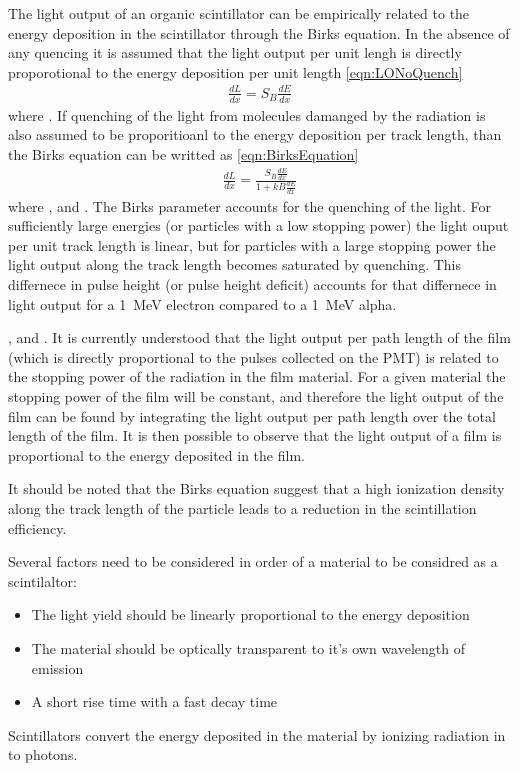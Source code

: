 The light output of an organic scintillator can be empirically related to the energy deposition in the scintillator through the Birks equation.
In the absence of any quencing it is assumed that the light output per unit lengh is directly proporotional to the energy deposition per unit length \eqref{eqn:LONoQuench}
\begin{align}
  \label{eqn:LONoQuench}
    \frac{dL}{dx} = S_B\frac{dE}{dx}
\end{align}
where .
If quenching of the light from molecules damanged by the radiation is also assumed to be proporitioanl to the energy deposition per track length, than the Birks equation can be writted as \eqref{eqn:BirksEquation}
\begin{align}
  \label{eqn:BirksEquation}
    \frac{dL}{dx} = \frac{S_B\frac{dE}{dx}}{1+kB\frac{dE}{dx}}
    \end{align}
    where , and .
The Birks parameter accounts for the quenching of the light.
For sufficiently large energies (or particles with a low stopping power) the light ouput per unit track length is linear, but for particles with a large stopping power the light output along the track length becomes saturated by quenching.
This differnece in pulse height (or pulse height deficit) accounts for that differnece in light output for a \SI{1}{\MeV} electron compared to a \SI{1}{\MeV} alpha.

, and .
It is currently understood that the light output per path length of the film (which is directly proportional to the pulses collected on the PMT) is related to the stopping power of the radiation in the film material.
    For a given material the stopping power of the film will be constant, and therefore the light output of the film can be found by integrating the light output per path length over the total length of the film.
    It is then possible to observe that the light output of a film is proportional to the energy deposited in the film.

It should be noted that the Birks equation suggest that a high ionization density along the track length of the particle leads to a reduction in the scintillation efficiency.

Several factors need to be considered in order of a material to be considred as a scintilaltor:
\begin{itemize}
  \item The light yield should be linearly proportional to the energy deposition
  \item The material should be optically transparent to it's own wavelength of emission
  \item A short rise time with a fast decay time
\end{itemize}
Scintillators convert the energy deposited in the material by ionizing radiation in to photons.


